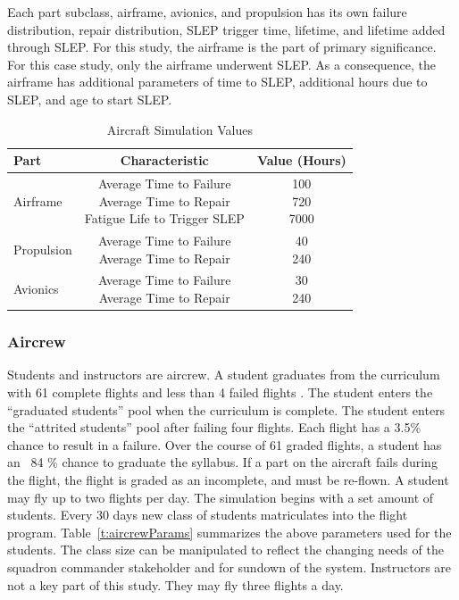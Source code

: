 \documentclass[preprint,12pt]{elsarticle}
\begin{document}
Each part subclass, airframe, avionics, and propulsion has its own
failure distribution, repair distribution, SLEP trigger time,
lifetime, and lifetime added through SLEP. For this study, the
airframe is the part of primary significance. For  this case study,
only the airframe underwent SLEP. As a consequence, the airframe has
additional parameters of time to SLEP, additional  hours due to SLEP,
and age to start SLEP.

\begin{table}[h]
  \caption{Aircraft Simulation Values}
  \label{t:PartSettings}
  \begin{center}
  \begin{tabular}{l c c}
    \hline
    \hline
    \textbf{Part} & \textbf{Characteristic} & \textbf{Value (Hours)} \\
    \hline
    Airframe & \makecell{ Average Time to Failure \\ Average Time to
      Repair \\ Fatigue Life to Trigger SLEP}  &
    \makecell{ 100 \\ 720 \\ 7000} \\
    \hline
    Propulsion & \makecell{ Average Time to Failure \\ Average Time to
      Repair}  &
    \makecell{ 40 \\ 240 \\ } \\
    \hline
    Avionics & \makecell{ Average Time to Failure \\ Average Time to
      Repair}  &
    \makecell{ 30 \\ 240 \\ } \\
    \hline
  \end{tabular}
  \end{center}
\end{table}



\subsubsection{Aircrew}

Students and instructors are aircrew.  A
student graduates from the curriculum with 61 complete flights and
less than 4 failed 
flights \cite{Air2009}. The student enters the ``graduated students''
pool when the curriculum is complete. The student enters the
``attrited students'' pool after failing four flights. Each flight has
a 3.5\% chance to result in a failure. Over the course of 61 graded
flights, a student has an ~84 \% chance to graduate the syllabus. If a
part on the aircraft fails during the flight, the 
flight is graded as an incomplete, and must be re-flown. A student may
fly up to two flights per day. The simulation begins with a set
amount of students. Every 30 days new class of students
matriculates into the flight program. Table~\ref{t:aircrewParams}
summarizes the above parameters used for the students. The class size
can be manipulated to reflect the changing needs of the squadron
commander stakeholder and for sundown of the system. Instructors are
not a key part of this study. They may fly three flights a
day. 
\end{document}
